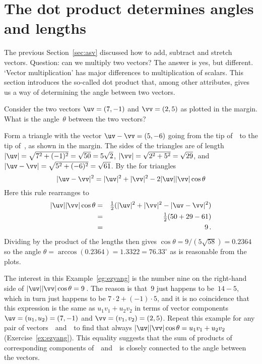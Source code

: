 
\section{The dot product determines angles and lengths}
\label{sec:dpdal}
\secttoc

The previous Section~\ref{sec:asv} discussed how to add, subtract and stretch vectors.
Question: can we multiply two vectors?
The answer is yes, but different. 
`Vector multiplication' has major differences to multiplication of scalars.
This section introduces the so-called dot product that, among other attributes, gives us a way of determining the angle between two vectors.

\begin{example} \label{eg:ezyang}
Consider the two vectors \(\uv=(7,-1)\) and \(\vv=(2,5)\) as plotted in the margin.
What is the angle~\(\theta\) between the two vectors?
\def\vecopsHook{\node[above] at (axis cs:0,0) {$\qquad\theta$};}
\begin{solution} 
Form a triangle with the vector \(\uv-\vv=(5,-6)\) going from the tip of~\vv\ to the tip of~\uv, as shown in the margin.
The sides of the triangles are of length \(|\uv|=\sqrt{7^2+(-1)^2}=\sqrt{50}=5\sqrt2\), \(|\vv|=\sqrt{2^2+5^2}=\sqrt{29}\), and \(|\uv-\vv|=\sqrt{5^2+(-6)^2}=\sqrt{61}\).
By the  for triangles
\begin{equation*}
|\uv-\vv|^2=|\uv|^2+|\vv|^2-2|\uv||\vv|\cos\theta
\end{equation*}
%
Here this rule rearranges to
\begin{eqnarray*}
|\uv||\vv|\cos\theta
&=&\tfrac12(|\uv|^2+|\vv|^2-|\uv-\vv|^2)
\\&=&\tfrac12(50+29-61)
\\&=&9\,.
\end{eqnarray*}
Dividing by the product of the lengths then gives \(\cos\theta=9/(5\sqrt{58})=0.2364\) so the angle \(\theta =\arccos(0.2364) =1.3322 =76.33^\circ\) as is reasonable from the plots.
\end{solution}
\end{example}

The interest in this Example~\ref{eg:ezyang} is the number nine on the right-hand side of \(|\uv||\vv|\cos\theta=9\)\,.  
The reason is that~\(9\) just happens to be~\(14-5\), which in turn just happens to be \(7\cdot2+(-1)\cdot5\), and it is no coincidence that this expression is the same as \(u_1v_1+u_2v_2\) in terms of vector components \(\uv=(u_1,u_2)=(7,-1)\) and \(\vv=(v_1,v_2)=(2,5)\).
Repeat this example for any pair of vectors~\uv\ and~\vv\ to find that always \(|\uv||\vv|\cos\theta=u_1v_1+u_2v_2\) (Exercise~\ref{ex:ezyang}).
This equality suggests that the sum of products of corresponding components of~\uv\ and~\vv\ is closely connected to the angle between the vectors.


